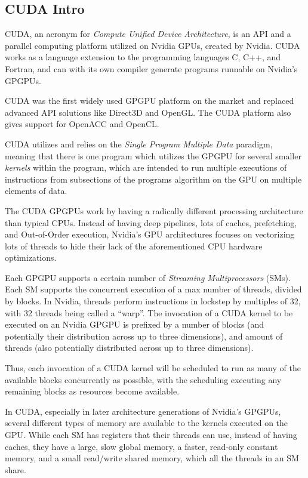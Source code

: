 \subsection{CUDA Intro}

CUDA, an acronym for \textit{Compute Unified Device Architecture}, is an API and a parallel computing platform utilized on Nvidia GPUs, created by Nvidia.
CUDA works as a language extension to the programming languages C, C++, and Fortran, and can with its own compiler generate programs runnable on Nvidia's GPGPUs.

CUDA was the first widely used GPGPU platform on the market and replaced advanced API solutions like Direct3D and OpenGL.
The CUDA platform also gives support for OpenACC and OpenCL.

CUDA utilizes and relies on the \textit{Single Program Multiple Data} paradigm, meaning that there is one program which utilizes the GPGPU for several smaller \textit{kernels} within the program, which are intended to run multiple executions of instructions from subsections of the programs algorithm on the GPU on multiple elements of data.

The CUDA GPGPUs work by having a radically different processing architecture than typical CPUs.
Instead of having deep pipelines, lots of caches, prefetching, and Out-of-Order execution, Nvidia's GPU architectures focuses on vectorizing lots of threads to hide their lack of the aforementioned CPU hardware optimizations.

Each GPGPU supports a certain number of \textit{Streaming Multiprocessors} (SMs).
Each SM supports the concurrent execution of a max number of threads, divided by blocks. In Nvidia, threads perform instructions in lockstep by multiples of 32, with 32 threads being called a ``warp''.
The invocation of a CUDA kernel to be executed on an Nvidia GPGPU is prefixed by a number of blocks (and potentially their distribution across up to three dimensions), and amount of threads (also potentially distributed across up to three dimensions).

Thus, each invocation of a CUDA kernel will be scheduled to run as many of the available blocks concurrently as possible, with the scheduling executing any remaining blocks as resources become available.

In CUDA, especially in later architecture generations of Nvidia's GPGPUs, several different types of memory are available to the kernels executed on the GPU.
While each SM has registers that their threads can use, instead of having caches, they have a large, slow global memory, a faster, read-only constant memory, and a small read/write shared memory, which all the threads in an SM share.

